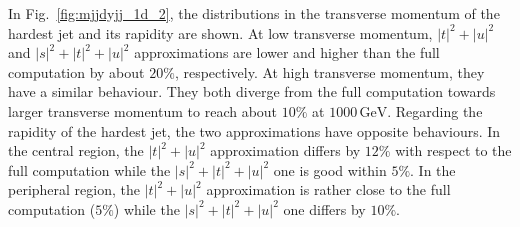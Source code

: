 \documentclass[twocolumn,epjc3]{svjour3} %
\newcommand{\GeV}{\ensuremath{\,\text{GeV}}\xspace}
\begin{document}
    In Fig.~\ref{fig:mjjdyjj_1d_2}, the distributions in the transverse momentum of the hardest jet and its rapidity are shown.
    At low transverse momentum, $|t|^2+|u|^2$ and $|s|^2+|t|^2+|u|^2$ approximations are lower and higher than the full computation by about $20\%$, respectively.
    At high transverse momentum, they have a similar behaviour.
    They both diverge from the full computation towards larger transverse momentum to reach about $10\%$ at $1000\GeV$.
    Regarding the rapidity of the hardest jet, the two approximations have opposite behaviours.
    In the central region, the $|t|^2+|u|^2$ approximation differs by $12\%$ with respect to the full computation while the $|s|^2+|t|^2+|u|^2$ one is good within $5\%$.
    In the peripheral region, the $|t|^2+|u|^2$ approximation is rather close to the full computation ($5\%$) while the $|s|^2+|t|^2+|u|^2$ one differs by $10\%$.
\end{document}
